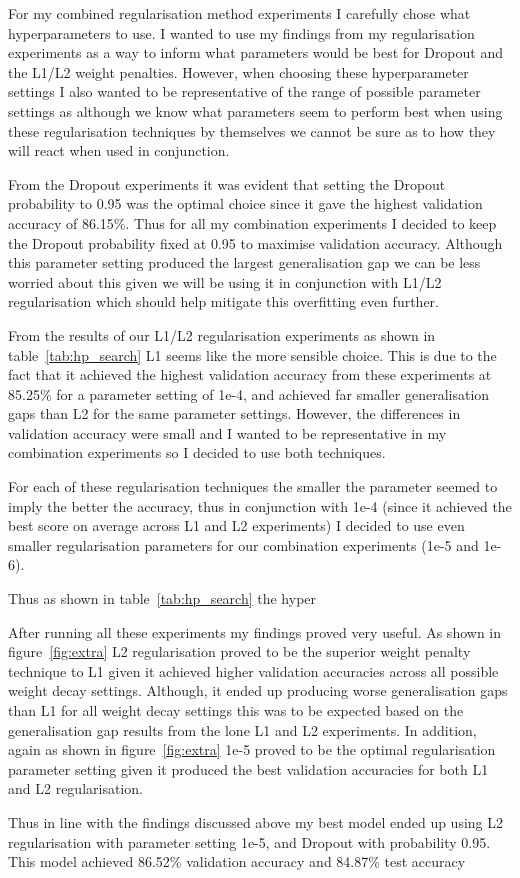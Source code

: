 {{For my combined regularisation method experiments I carefully chose what hyperparameters to use. I wanted to use my findings from my regularisation experiments as a way to inform what parameters would be best for Dropout and the L1/L2 weight penalties. However, when choosing these hyperparameter settings I also wanted to be representative of the range of possible parameter settings as although we know what parameters seem to perform best when using these regularisation techniques by themselves we cannot be sure as to how they will react when used in conjunction.

From the Dropout experiments it was evident that setting the Dropout probability to 0.95 was the optimal choice since it gave the highest validation accuracy of 86.15\%. Thus for all my combination experiments I decided to keep the Dropout probability fixed at 0.95 to maximise validation accuracy. Although this parameter setting produced the largest generalisation gap we can be less worried about this given we will be using it in conjunction with L1/L2 regularisation which should help mitigate this overfitting even further.

From the results of our L1/L2 regularisation experiments as shown in table~\ref{tab:hp_search} L1 seems like the more sensible choice. This is due to the fact that it achieved the highest validation accuracy from these experiments at 85.25\% for a parameter setting of 1e-4, and achieved far smaller generalisation gaps than L2 for the same parameter settings. However, the differences in validation accuracy were small and I wanted to be representative in my combination experiments so I decided to use both techniques.

For each of these regularisation techniques the smaller the parameter seemed to imply the better the accuracy, thus in conjunction with 1e-4 (since it achieved the best score on average across L1 and L2 experiments) I decided to use even smaller regularisation parameters for our combination experiments (1e-5 and 1e-6).

Thus as shown in table~\ref{tab:hp_search} the hyper

After running all these experiments my findings proved very useful. As shown in figure~\ref{fig:extra} L2 regularisation proved to be the superior weight penalty technique to L1 given it achieved higher validation accuracies across all possible weight decay settings. Although, it ended up producing worse generalisation gaps than L1 for all weight decay settings this was to be expected based on the generalisation gap results from the lone L1 and L2 experiments. In addition, again as shown in figure~\ref{fig:extra} 1e-5 proved to be the optimal regularisation parameter setting given it produced the best validation accuracies for both L1 and L2 regularisation. 

Thus in line with the findings discussed above my best model ended up using L2 regularisation with parameter setting 1e-5, and Dropout with probability 0.95. This model achieved 86.52\% validation accuracy and 84.87\% test accuracy 
}
}

